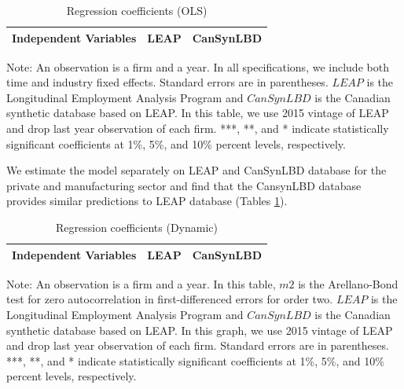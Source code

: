 \documentclass{article}
\begin{document}
\begin{table}[H]
  \centering
\begin{threeparttable}
 \caption{Regression coefficients (OLS)} \label{OLS} \medskip
\renewcommand{\arraystretch}{1}
\begin{tabular}{l|c c| c c}
\toprule
\textbf{Independent Variables}&\multicolumn{2}{c|}{\textbf{LEAP}} &  \multicolumn{2}{c}{\textbf{CanSynLBD}}\\
\midrule

   \bottomrule
  \end{tabular} 
\begin{tablenotes}
\small
\item Note: An observation is a firm and a year. In all specifications, we include both time and industry fixed effects. Standard errors are in parentheses. $LEAP$ is the Longitudinal Employment Analysis Program and $CanSynLBD$ is the Canadian synthetic database based on LEAP. In this table, we use 2015 vintage of LEAP and drop last year observation of each firm. ***, **, and * indicate statistically significant coefficients at 1\%, 5\%, and 10\% percent levels, respectively.
 \end{tablenotes}
 \end{threeparttable}
\end{table}

We estimate the model separately on LEAP and CanSynLBD database for the private and manufacturing sector and find that the CansynLBD database provides similar predictions to LEAP database (Tables  \ref{OLS}).




\begin{table}[H]
  \centering
\begin{threeparttable}
 \caption{Regression coefficients (Dynamic)} \label{Dynamic - GMM} \medskip
\renewcommand{\arraystretch}{1}
\begin{tabular}{l|c c| c c}
\toprule
\textbf{Independent Variables}&\multicolumn{2}{c|}{\textbf{LEAP}} &  \multicolumn{2}{c}{\textbf{CanSynLBD}}\\
\midrule

   \bottomrule
  \end{tabular} 
\begin{tablenotes}
\small
\item Note: An observation is a firm and a year. In this table, $m2$ is the Arellano-Bond test for zero autocorrelation in first-differenced errors for order two. $LEAP$ is the Longitudinal Employment Analysis Program and $CanSynLBD$ is the Canadian synthetic database based on LEAP. In this graph, we use 2015 vintage of LEAP and drop last year observation of each firm. Standard errors are in parentheses. ***, **, and * indicate statistically significant coefficients at 1\%, 5\%, and 10\% percent levels, respectively.
 \end{tablenotes}
 \end{threeparttable}
\end{table}
\end{document}
